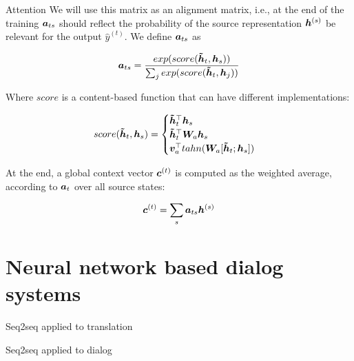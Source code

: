 \documentclass[10pt]{beamer}
\begin{document}
\begin{frame}{Attention}
We will use this matrix as an alignment matrix, i.e., at the end of the training $\bm{a}_{ts}$ should reflect the probability of the source representation $\bm{h}^{(s)}$ be relevant for the output $\hat{y}^{(t)}$. We define $\bm{a}_{ts}$ as

\begin{equation}
\bm{a}_{ts} = \frac{exp(score(\bm{\tilde{h}}_t,\bm{h}_s))}{\sum_j exp(score(\bm{\tilde{h}}_t,\bm{h}_j))}
\end{equation}

Where $score$ is a content-based function that can have different implementations: 

\begin{equation}
score(\bm{\tilde{h}}_t,\bm{h}_s) = \begin{cases}
\bm{\tilde{h}}_t ^{\top}\bm{h}_s\\
\bm{\tilde{h}}_t ^{\top}\bm{W}_a \bm{h}_s\\
\bm{v}_a ^{\top}tahn(\bm{W}_a[\bm{\tilde{h}}_t;\bm{h}_s])\\
\end{cases}
\end{equation}

At the end, a global context vector $\bm{c}^{(t)}$ is computed as the weighted average, according to $\bm{a}_t$ over all source states:

\begin{equation}
\bm{c}^{(t)} = \sum_{s} \bm{a}_{ts}\bm{h}^{(s)}
\end{equation}


\end{frame}


\section{Neural network based dialog systems}

\begin{frame}{Seq2seq applied to translation}

\end{frame}

\begin{frame}{Seq2seq applied to dialog \cite{DBLP:journals/corr/VinyalsL15}}

\end{frame}
\end{document}
